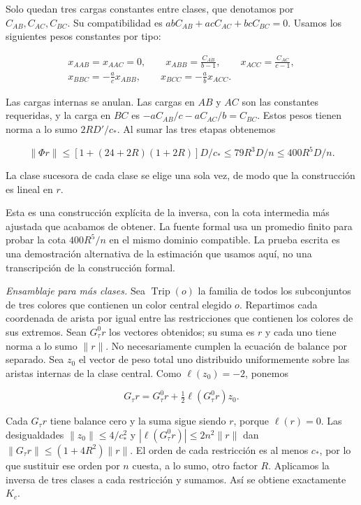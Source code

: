 \documentclass[spanish,11pt,a4paper]{article}
\begin{document}
Solo quedan tres cargas constantes entre clases, que denotamos por \(C_{AB},C_{AC},C_{BC}\). Su compatibilidad es \(abC_{AB}+acC_{AC}+bcC_{BC}=0\). Usamos los siguientes pesos constantes por tipo:

\[\begin{gathered}
x_{AAB}=x_{AAC}=0,\qquad
x_{ABB}=\frac{C_{AB}}{b-1},\qquad x_{ACC}=\frac{C_{AC}}{c-1},\\
x_{BBC}=-\frac{a}{c}x_{ABB},\qquad
x_{BCC}=-\frac{a}{b}x_{ACC}.
\end{gathered}
\tag{B.2}\]

Las cargas internas se anulan. Las cargas en \(AB\) y \(AC\) son las constantes requeridas, y la carga en \(BC\) es \(-aC_{AB}/c-aC_{AC}/b=C_{BC}\). Estos pesos tienen norma a lo sumo \(2RD'/c_\ast\). Al sumar las tres etapas obtenemos

\[\|\Phi r\|\le[1+(24+2R)(1+2R)]D/c_\ast\le79R^3D/n\le400R^5D/n.\]

La clase sucesora de cada clase se elige una sola vez, de modo que la construcción es lineal en \(r\).

Esta es una construcción explícita de la inversa, con la cota intermedia más ajustada que acabamos de obtener. La fuente formal usa un promedio finito para probar la cota \(400R^5/n\) en el mismo dominio compatible. La prueba escrita es una demostración alternativa de la estimación que usamos aquí, no una transcripción de la construcción formal.

\emph{Ensamblaje para más clases.} Sea \(\operatorname{Trip}(o)\) la familia de todos los subconjuntos de tres colores que contienen un color central elegido \(o\). Repartimos cada coordenada de arista por igual entre las restricciones que contienen los colores de sus extremos. Sean \(G^0_\tau r\) los vectores obtenidos; su suma es \(r\) y cada uno tiene norma a lo sumo \(\|r\|\). No necesariamente cumplen la ecuación de balance por separado. Sea \(z_0\) el vector de peso total uno distribuido uniformemente sobre las aristas internas de la clase central. Como \(\ell(z_0)=-2\), ponemos

\[G_\tau r=G^0_\tau r+\tfrac12\ell(G^0_\tau r)z_0.\]

Cada \(G_\tau r\) tiene balance cero y la suma sigue siendo \(r\), porque \(\ell(r)=0\). Las desigualdades \(\|z_0\|\le4/c_\ast^2\) y \(|\ell(G^0_\tau r)|\le2n^2\|r\|\) dan \(\|G_\tau r\|\le(1+4R^2)\|r\|\). El orden de cada restricción es al menos \(c_\ast\), por lo que sustituir ese orden por \(n\) cuesta, a lo sumo, otro factor \(R\). Aplicamos la inversa de tres clases a cada restricción y sumamos. Así se obtiene exactamente \(K_c\).
\end{document}
